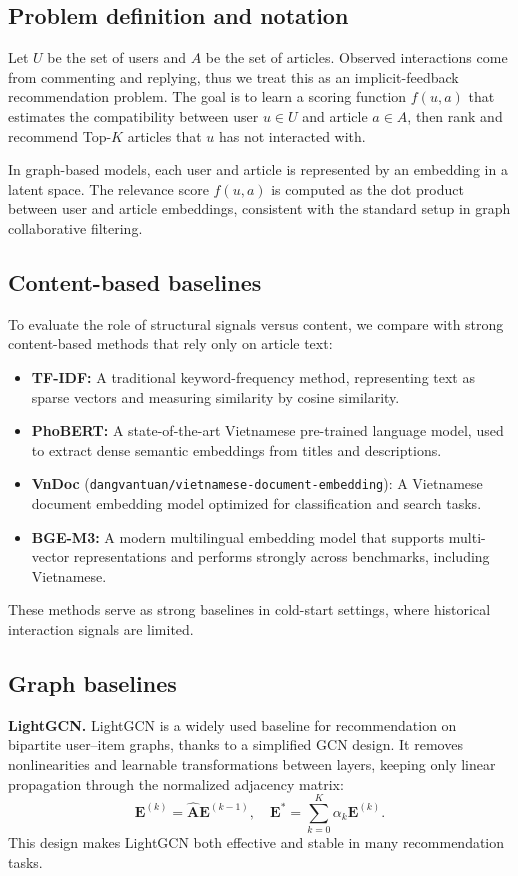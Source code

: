 \documentclass[11pt]{article}
\begin{document}
\subsection{Problem definition and notation}
Let $U$ be the set of users and $A$ be the set of articles.
Observed interactions come from commenting and replying,
thus we treat this as an implicit-feedback recommendation problem.
The goal is to learn a scoring function $f(u,a)$
that estimates the compatibility between user $u \in U$ and article $a \in A$,
then rank and recommend Top-$K$ articles that $u$ has not interacted with.

In graph-based models,
each user and article is represented by an embedding in a latent space.
The relevance score $f(u,a)$ is computed as the dot product between user and article embeddings,
consistent with the standard setup in graph collaborative filtering.

\subsection{Content-based baselines}
To evaluate the role of structural signals versus content,
we compare with strong content-based methods that rely only on article text:
\begin{itemize}
    \item \textbf{TF-IDF:} A traditional keyword-frequency method,
          representing text as sparse vectors and measuring similarity by cosine similarity.
    \item \textbf{PhoBERT:} A state-of-the-art Vietnamese pre-trained language model,
          used to extract dense semantic embeddings from titles and descriptions.
    \item \textbf{VnDoc} (\texttt{dangvantuan/vietnamese-document-embedding}): A Vietnamese document embedding model
          optimized for classification and search tasks.
    \item \textbf{BGE-M3:} A modern multilingual embedding model
          that supports multi-vector representations and performs strongly across benchmarks, including Vietnamese.
\end{itemize}
These methods serve as strong baselines in cold-start settings,
where historical interaction signals are limited.

\subsection{Graph baselines}
\textbf{LightGCN.}
LightGCN is a widely used baseline for recommendation on bipartite user--item graphs,
thanks to a simplified GCN design.
It removes nonlinearities and learnable transformations between layers,
keeping only linear propagation through the normalized adjacency matrix:
\[
    \mathbf{E}^{(k)} = \hat{\mathbf{A}} \mathbf{E}^{(k-1)}, \quad
    \mathbf{E}^{*}=\sum_{k=0}^{K}\alpha_k \mathbf{E}^{(k)}.
\]
This design makes LightGCN both effective and stable in many recommendation tasks.
\end{document}
